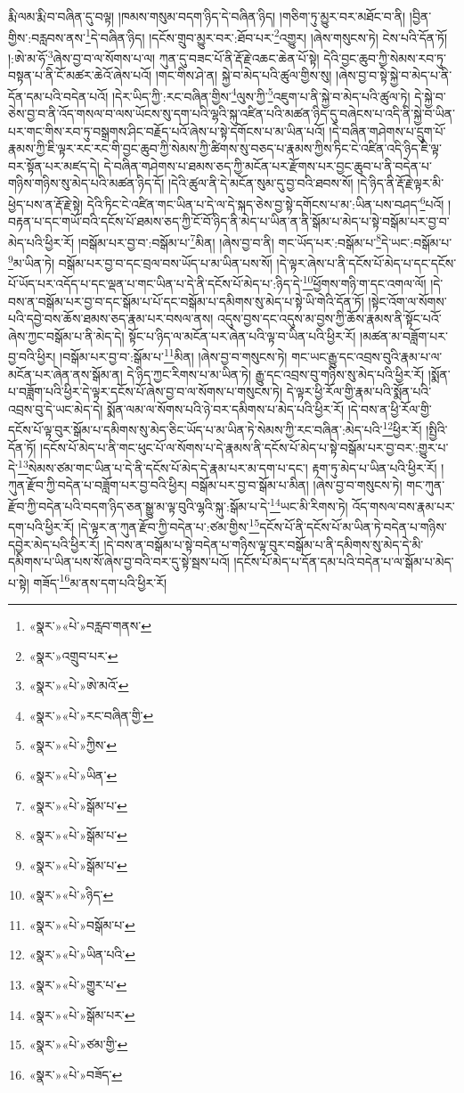 རྨི་ལམ་རྨི་བ་བཞིན་དུ་བལྟ། །ཁམས་གསུམ་བདག་ཉིད་དེ་བཞིན་ཉིད། །གཅིག་ཏུ་མྱུར་བར་མཐོང་བ་ནི། །བྱིན་གྱིས་:བརླབས་ནས་\footnote{«སྣར་»«པེ་»བརླབ་གནས་}དེ་བཞིན་ཉིད། །དངོས་གྲུབ་མྱུར་བར་:ཐོབ་པར་\footnote{«སྣར་»འགྲུབ་པར་}འགྱུར། །ཞེས་གསུངས་ཏེ། ངེས་པའི་དོན་ཏོ། །:ཨེ་མ་ཧོ་\footnote{«སྣར་»«པེ་»ཨེ་མའོ་}ཞེས་བྱ་བ་ལ་སོགས་པ་ལ། ཀུན་དུ་བཟང་པོ་ནི་རྡོ་རྗེ་འཆང་ཆེན་པོ་སྟེ། དེའི་བྱང་ཆུབ་ཀྱི་སེམས་རབ་ཏུ་བསྟན་པ་ནི་ངོ་མཚར་ཆེའོ་ཞེས་པའོ། །གང་གིས་ཤེ་ན། སྐྱེ་བ་མེད་པའི་ཚུལ་གྱིས་སུ། །ཞེས་བྱ་བ་སྟེ་སྐྱེ་བ་མེད་པ་ནི་དོན་དམ་པའི་བདེན་པའོ། །དེར་ཡིད་ཀྱི་:རང་བཞིན་གྱིས་\footnote{«སྣར་»«པེ་»རང་བཞིན་གྱི་}ལུས་ཀྱི་\footnote{«སྣར་»«པེ་»ཀྱིས་}འཇུག་པ་ནི་སྐྱེ་བ་མེད་པའི་ཚུལ་ཏེ། དེ་སྐྱེ་བ་ཅེས་བྱ་བ་ནི་འོད་གསལ་བ་ལས་ཡོངས་སུ་དག་པའི་ལྷའི་སྐུ་འཛིན་པའི་མཚན་ཉིད་དུ་བཞེངས་པ་འདི་ནི་སྐྱེ་བ་ཡིན་པར་གང་གིས་རབ་ཏུ་བསྒྲགས་ཤིང་བརྗོད་པའོ་ཞེས་པ་སྟེ་དགོངས་པ་མ་ཡིན་པའོ། །དེ་བཞིན་གཤེགས་པ་དྲུག་པོ་རྣམས་ཀྱི་ཇི་ལྟར་རང་རང་གི་བྱང་ཆུབ་ཀྱི་སེམས་ཀྱི་ཚིགས་སུ་བཅད་པ་རྣམས་ཀྱིས་ཏིང་ངེ་འཛིན་འདི་ཉིད་ཇི་ལྟ་བར་སྟོན་པར་མཛད་དེ། དེ་བཞིན་གཤེགས་པ་ཐམས་ཅད་ཀྱི་མངོན་པར་རྫོགས་པར་བྱང་ཆུབ་པ་ནི་བདེན་པ་གཉིས་གཉིས་སུ་མེད་པའི་མཚན་ཉིད་དོ། །དེའི་ཚུལ་ནི་དེ་མངོན་སུམ་དུ་བྱ་བའི་ཐབས་སོ། །དེ་ཉིད་ནི་རྡོ་རྗེ་ལྟར་མི་ཕྱེད་པས་ན་རྡོ་རྗེ་སྟེ། དེའི་ཏིང་ངེ་འཛིན་གང་ཡིན་པ་དེ་ལ་དེ་སྐད་ཅེས་བྱ་སྟེ་དགོངས་པ་མ་:ཡིན་པས་བཤད་\footnote{«སྣར་»«པེ་»ཡིན་}པའོ། །བརྟན་པ་དང་གཡོ་བའི་དངོས་པོ་ཐམས་ཅད་ཀྱི་ངོ་བོ་ཉིད་ནི་མེད་པ་ཡིན་ན་ནི་སྒོམ་པ་མེད་པ་སྟེ་བསྒོམ་པར་བྱ་བ་མེད་པའི་ཕྱིར་རོ། །བསྒོམ་པར་བྱ་བ་:བསྒོམ་པ་\footnote{«སྣར་»«པེ་»སྒོམ་པ་}མིན། །ཞེས་བྱ་བ་ནི། གང་ཡོད་པར་:བསྒོམ་པ་\footnote{«སྣར་»«པེ་»སྒོམ་པ་}དེ་ཡང་:བསྒོམ་པ་\footnote{«སྣར་»«པེ་»སྒོམ་པ་}མ་ཡིན་ཏེ། བསྒོམ་པར་བྱ་བ་དང་བྲལ་བས་ཡོད་པ་མ་ཡིན་པས་སོ། །དེ་ལྟར་ཞེས་པ་ནི་དངོས་པོ་མེད་པ་དང་དངོས་པོ་ཡོད་པར་འདོད་པ་དང་ལྡན་པ་གང་ཡིན་པ་དེ་ནི་དངོས་པོ་མེད་པ་:ཉིད་དེ་\footnote{«སྣར་»«པེ་»ཉིད་}ཕྱོགས་གཉི་ག་དང་འགལ་ལོ། །དེ་བས་ན་བསྒོམ་པར་བྱ་བ་དང་སྒོམ་པ་པོ་དང་བསྒོམ་པ་དམིགས་སུ་མེད་པ་སྟེ་ཡི་གེའི་དོན་ཏོ། །སྟེང་འོག་ལ་སོགས་པའི་དབྱེ་བས་ཆོས་ཐམས་ཅད་རྣམ་པར་བསལ་ནས། འདུས་བྱས་དང་འདུས་མ་བྱས་ཀྱི་ཆོས་རྣམས་ནི་སྟོང་པའོ་ཞེས་ཀྱང་བསྒོམ་པ་ནི་མེད་དེ། སྟོང་པ་ཉིད་ལ་མངོན་པར་ཞེན་པའི་ལྟ་བ་ཡིན་པའི་ཕྱིར་རོ། །མཚན་མ་བཟློག་པར་བྱ་བའི་ཕྱིར། །བསྒོམ་པར་བྱ་བ་:སྒོམ་པ་\footnote{«སྣར་»«པེ་»བསྒོམ་པ་}མིན། །ཞེས་བྱ་བ་གསུངས་ཏེ། གང་ཡང་རྒྱུ་དང་འབྲས་བུའི་རྣམ་པ་ལ་མངོན་པར་ཞེན་ནས་སྒོམ་ན། དེ་ཉིད་ཀྱང་རིགས་པ་མ་ཡིན་ཏེ། རྒྱུ་དང་འབྲས་བུ་གཉིས་སུ་མེད་པའི་ཕྱིར་རོ། །སྨོན་པ་བཟློག་པའི་ཕྱིར་དེ་ལྟར་དངོས་པོ་ཞེས་བྱ་བ་ལ་སོགས་པ་གསུངས་ཏེ། དེ་ལྟར་ཕྱི་རོལ་གྱི་རྣམ་པའི་སྨོན་པའི་འབྲས་བུ་དེ་ཡང་མེད་དེ། སྨོན་ལམ་ལ་སོགས་པའི་ཉེ་བར་དམིགས་པ་མེད་པའི་ཕྱིར་རོ། །དེ་བས་ན་ཕྱི་རོལ་གྱི་དངོས་པོ་ལྟ་བུར་སྒོམ་པ་དམིགས་སུ་མེད་ཅིང་ཡོད་པ་མ་ཡིན་ཏེ་སེམས་ཀྱི་རང་བཞིན་:མེད་པའི་\footnote{«སྣར་»«པེ་»ཡིན་པའི་}ཕྱིར་རོ། །སྤྱིའི་དོན་ཏོ། །དངོས་པོ་མེད་པ་ནི་གང་ཕུང་པོ་ལ་སོགས་པ་དེ་རྣམས་ནི་དངོས་པོ་མེད་པ་སྟེ་བསྒོམ་པར་བྱ་བར་:གྱུར་པ་དེ་\footnote{«སྣར་»«པེ་»གྱུར་པ་}སེམས་ཙམ་གང་ཡིན་པ་དེ་ནི་དངོས་པོ་མེད་དེ་རྣམ་པར་མ་དག་པ་དང་། རྟག་ཏུ་མེད་པ་ཡིན་པའི་ཕྱིར་རོ། །ཀུན་རྫོབ་ཀྱི་བདེན་པ་བཟློག་པར་བྱ་བའི་ཕྱིར། བསྒོམ་པར་བྱ་བ་སྒོམ་པ་མིན། །ཞེས་བྱ་བ་གསུངས་ཏེ། གང་ཀུན་རྫོབ་ཀྱི་བདེན་པའི་བདག་ཉིད་ཅན་སྒྱུ་མ་ལྟ་བུའི་ལྷའི་སྐུ་:སྒོམ་པ་དེ་\footnote{«སྣར་»«པེ་»སྒོམ་པར་}ཡང་མི་རིགས་ཏེ། འོད་གསལ་བས་རྣམ་པར་དག་པའི་ཕྱིར་རོ། །དེ་ལྟར་ན་ཀུན་རྫོབ་ཀྱི་བདེན་པ་:ཙམ་གྱིས་\footnote{«སྣར་»«པེ་»ཙམ་གྱི་}དངོས་པོ་ནི་དངོས་པོ་མ་ཡིན་ཏེ་བདེན་པ་གཉིས་དབྱེར་མེད་པའི་ཕྱིར་རོ། །དེ་བས་ན་བསྒོམ་པ་སྟེ་བདེན་པ་གཉིས་ལྟ་བུར་བསྒོམ་པ་ནི་དམིགས་སུ་མེད་དེ་མི་དམིགས་པ་ཡིན་པས་སོ་ཞེས་བྱ་བའི་བར་དུ་སྟེ་སྦས་པའོ། །དངོས་པོ་མེད་པ་དོན་དམ་པའི་བདེན་པ་ལ་སྒོམ་པ་མེད་པ་སྟེ། གཟོད་\footnote{«སྣར་»«པེ་»བཟོད་}མ་ནས་དག་པའི་ཕྱིར་རོ། 